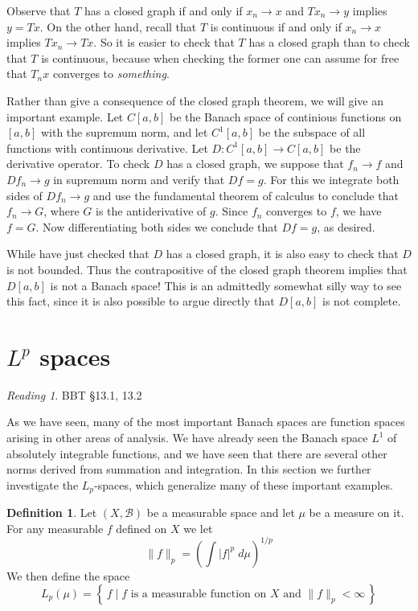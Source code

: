 \documentclass[11pt,oneside]{amsbook}
\newcommand{\set}[1]{\left\{\,#1\,\right\}}
\theoremstyle{definition}
\theoremstyle{plain}
\theoremstyle{definition}
\newtheorem{defn}[thm]{Definition}
\theoremstyle{remark}
\newtheorem*{reading}{Reading}
\numberwithin{equation}{section}
\numberwithin{figure}{section}
\begin{document}
Observe that $T$ has a closed graph if and only if $x_n\to x$ and $Tx_n\to y$ implies $y=Tx$. On the other hand, recall that $T$ is continuous if and only if $x_n\to x$ implies $Tx_n\to Tx$.  So it is easier to check that $T$ has a closed graph than to check that $T$ is continuous, because when checking the former one can assume for free that $T_nx$ converges to \emph{something}.

Rather than give a consequence of the closed graph theorem, we will give an important example. Let $C[a,b]$ be the Banach space of continious functions on $[a,b]$ with the supremum norm, and let $C^1[a,b]$ be the subspace of all functions with continuous derivative. Let $D\colon C^1[a,b]\to C[a,b]$ be the derivative operator. To check $D$ has a closed graph, we suppose that $f_n\to f$ and $Df_n\to g$ in supremum norm and verify that $Df=g$. For this we integrate both sides of $Df_n\to g$ and use the fundamental theorem of calculus to conclude that $f_n\to G$, where $G$ is the antiderivative of $g$. Since $f_n$ converges to $f$, we have $f=G$. Now differentiating both sides we conclude that $Df=g$, as desired.

While have just checked that $D$ has a closed graph, it is also easy to check that $D$ is not bounded. Thus the contrapositive of the closed graph theorem implies that $D[a,b]$ is not a Banach space! This is an admittedly somewhat silly way to see this fact, since it is also possible to argue directly that $D[a,b]$ is not complete.


\section{$L^p$ spaces}

\begin{reading}
  BBT \S 13.1, 13.2
\end{reading}

As we have seen, many of the most important Banach spaces are function spaces arising in other areas of analysis. We have already seen the Banach space $L^1$ of absolutely integrable functions, and we have seen that there are several other norms derived from summation and integration. In this section we further investigate the $L_p$-spaces, which generalize many of these important examples.

\begin{defn}
  Let $(X,\mathcal B)$ be a measurable space and let $\mu$ be a measure on it. For any measurable $f$ defined on $X$ we let
  \[\|f\|_p=\left(\int|f|^p\;d\mu\right)^{1/p}
  \]
  We then define the space
  \[L_p(\mu)=\set{f\mid\text{$f$ is a measurable function on $X$ and } \|f\|_p<\infty}
  \]
\end{defn}
\end{document}
